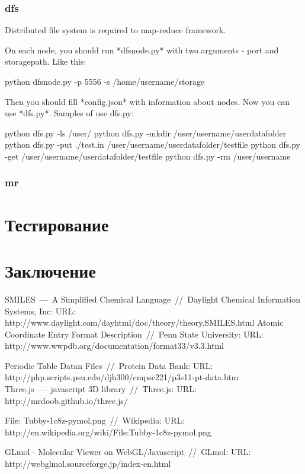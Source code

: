 \documentclass[12pt,a4paper,oneside]{extarticle}
\begin{document}
        \subsubsection{dfs}


            Distributed file system is required to map-reduce framework.

            On each node, you should run *dfsnode.py* with two arguments - port and storagepath. Like this:


                python dfsnode.py -p 5556 -s /home/username/storage


            Then you should fill *config.json* with information about nodes. Now you can use *dfs.py*. Samples of use dfs.py:


                python dfs.py -ls /user/
                python dfs.py -mkdir /user/username/userdatafolder
                python dfs.py -put ./test.in /user/username/userdatafolder/testfile
                python dfs.py -get /user/username/userdatafolder/testfile
                python dfs.py -rm /user/username
        \subsubsection{mr}
    \clearpage  


\clearpage

\section{Тестирование}
    
        
\clearpage

\section{Заключение}
    
\clearpage


\begin{thebibliography}{0}
         SMILES~---~A Simplified Chemical Language~//~Daylight Chemical Information Systems, Inc: URL: http://www.daylight.com/dayhtml/doc/theory/theory.SMILES.html
        Atomic Coordinate Entry Format Description~//~Penn State University: URL: http://www.wwpdb.org/documentation/format33/v3.3.html
        
        Periodic Table Datan Files~//~Protein Data Bank: URL: http://php.scripts.psu.edu/djh300/cmpsc221/p3s11-pt-data.htm
        Three.js~---~javascript 3D library~//~Three.js: URL: http://mrdoob.github.io/three.js/
        
       File: Tubby-1c8z-pymol.png~//~Wikipedia: URL: http://en.wikipedia.org/wiki/File:Tubby-1c8z-pymol.png
             
       GLmol - Molecular Viewer on WebGL/Javascript~//~GLmol: URL: http://webglmol.sourceforge.jp/index-en.html
        
\end{thebibliography}
\end{document}
